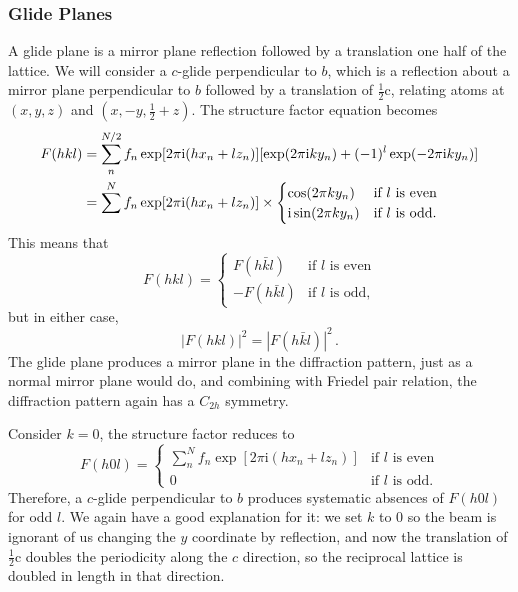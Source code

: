 \documentclass{article}
\theoremstyle{plain}\theoremheaderfont{\normalfont\itshape}\theorembodyfont{\rmfamily}\theoremseparator{.}\newtheorem*{rem}{Remark}\newtheorem*{ex}{Example}\newtheorem*{proof}{Proof}\newtheorem*{altp}{Alternative proof}
\theoremstyle{plain}\theoremheaderfont{\normalfont\bfseries}\theorembodyfont{\rmfamily}\theoremseparator{.}\newtheorem{thm}{Theorem}[section]\newtheorem{lem}[thm]{Lemma}\newtheorem{prop}[thm]{Proposition}\newtheorem*{cor}{Corollary}\newtheorem{defn}[thm]{Definition}\newtheorem{clm}[thm]{Claim}\newtheorem{clminproof}{Claim}\newtheorem*{law}{Law}\newtheorem{pos}[thm]{Postulate}
\theoremstyle{break}\theoremheaderfont{\normalfont\itshape}\theorembodyfont{\rmfamily}\theoremseparator{.\medskip}\newtheorem*{proofskip}{Proof}\newtheorem*{exs}{Examples}\newtheorem*{rems}{Remarks}
\theoremstyle{break}\theoremheaderfont{\normalfont\bfseries}\theorembodyfont{\rmfamily}\theoremseparator{.\medskip}\newtheorem{lemskip}[thm]{Lemma}\newtheorem{defnskip}[thm]{Definition}\newtheorem{propskip}[thm]{Proposition}\newtheorem{thmskip}[thm]{Theorem}
\numberwithin{equation}{section}
\newcommand{\ii}{\mathrm{i}}
\newcommand{\vb}[1]{\bm{\mathrm{#1}}}
\newcommand{\abs}[1]{\left| #1 \right|}
\begin{document}
    \subsubsection{Glide Planes}
    A glide plane is a mirror plane reflection followed by a translation one half of the lattice. We will consider a \(c\)-glide perpendicular to \(b\), which is a reflection about a mirror plane perpendicular to \(b\) followed by a translation of \(\frac{1}{2}\vb{c}\), relating atoms at \((x,y,z)\) and \((x,-y,\frac{1}{2}+z)\). The structure factor equation becomes
    \begin{align}
        F(hkl)&=\sum_{n}^{N/2}f_n\exp[2\pi \ii(hx_n+lz_n)][\exp(2\pi \ii ky_n)+(-1)^l\exp(-2\pi \ii ky_n)]\notag \\
        &=\sum^{N}f_n\exp[2\pi \ii(hx_n+lz_n)]\times\begin{cases}
            \cos(2\pi ky_n) & \text{if \(l\) is even} \\
            \ii\sin(2\pi ky_n) & \text{if \(l\) is odd.}
        \end{cases}
    \end{align}
    This means that
    \begin{equation}
        F(hkl)=\begin{cases}
            F(h\bar{k}l) & \text{if \(l\) is even} \\
            -F(h\bar{k}l) & \text{if \(l\) is odd,}
        \end{cases}
    \end{equation}
    but in either case,
    \begin{equation}
        \abs{F(hkl)}^2=\abs{F(h\bar{k}l)}^2\,.
    \end{equation}
    The glide plane produces a mirror plane in the diffraction pattern, just as a normal mirror plane would do, and combining with Friedel pair relation, the diffraction pattern again has a \(C_{2h}\) symmetry.

    Consider \(k=0\), the structure factor reduces to
    \begin{equation}
        F(h0l)=\begin{cases}
            \sum_{n}^{N}f_n\exp[2\pi \ii(hx_n+lz_n)] & \text{if \(l\) is even} \\
            0 & \text{if \(l\) is odd.}
        \end{cases}
    \end{equation}
    Therefore, a \(c\)-glide perpendicular to \(b\) produces systematic absences of \(F(h0l)\) for odd \(l\). We again have a good explanation for it: we set \(k\) to 0 so the beam is ignorant of us changing the \(y\) coordinate by reflection, and now the translation of \(\frac{1}{2}\vb{c}\) doubles the periodicity along the \(c\) direction, so the reciprocal lattice is doubled in length in that direction.
    
\end{document}
